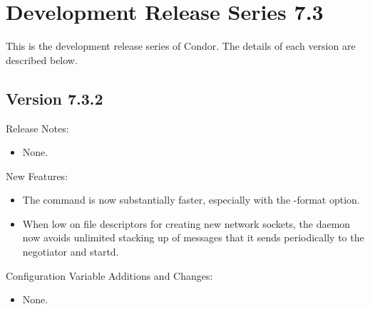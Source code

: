 
\section{\label{sec:History-7-3}Development Release Series 7.3}

This is the development release series of Condor.
The details of each version are described below.

\subsection*{\label{sec:New-7-3-2}Version 7.3.2}

\noindent Release Notes:

\begin{itemize}

\item None.

\end{itemize}


\noindent New Features:

\begin{itemize}

\item The  command is now substantially faster, especially with the
-format option.

\item When low on file descriptors for creating new network sockets,
the  daemon now avoids unlimited stacking up of
messages that it sends periodically to the negotiator and startd.

\end{itemize}

\noindent Configuration Variable Additions and Changes:

\begin{itemize}

\item None.

\end{itemize}

